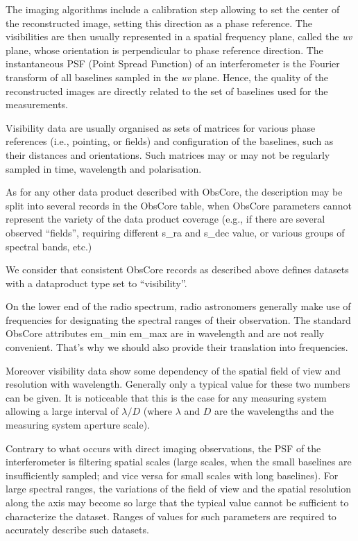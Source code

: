 \documentclass[11pt,a4paper]{ivoa}
\begin{document}
The imaging algorithms include a calibration step allowing to set the center of the 
reconstructed image, setting this direction as a phase reference. The visibilities
are then usually represented in a spatial frequency plane, called the \emph{uv} plane, 
whose orientation is perpendicular to phase reference direction. The instantaneous PSF 
(Point Spread Function) of an interferometer is the Fourier transform of all baselines 
sampled in the \emph{uv} plane. Hence, the quality of the reconstructed images are 
directly related to the set of baselines used for the measurements.

Visibility data are usually organised as sets of matrices for various phase references
(i.e., pointing, or fields) and configuration of the baselines, such as their
distances and orientations. Such matrices may or may not be regularly sampled in time, 
wavelength and polarisation.
    
As for any other data product described with ObsCore, the description may be split into
several records in the ObsCore table, when ObsCore parameters cannot represent the 
variety of the data product coverage (e.g., if there are several observed ``fields'', 
requiring different s\_ra and s\_dec value, or various groups of spectral bands, etc.) 

We consider that consistent ObsCore records as described above defines datasets with 
a dataproduct type set to ``visibility''.

On the lower end of the radio spectrum, radio astronomers generally make use of 
frequencies for designating the spectral ranges of their observation. The standard 
ObsCore attributes em\_min em\_max  are in wavelength and are not really convenient. 
That's why we should also provide their translation into frequencies. 
        
Moreover visibility data show some dependency of the spatial field of view and resolution 
with wavelength. Generally only a typical value for these two numbers can be given. It is 
noticeable that this is the case for any measuring system allowing a large interval of 
$\lambda/D$ (where $\lambda$ and $D$ are the wavelengths and the measuring system
aperture scale). 

Contrary to what occurs with direct imaging observations, the PSF of the interferometer
is filtering spatial scales (large scales, when the small baselines are insufficiently 
sampled; and vice versa for small scales with long baselines).
For large spectral ranges, the variations of the field of view and the spatial resolution 
along the axis may become so large that the typical value cannot be sufficient to 
characterize the dataset. Ranges of values for such parameters are required to accurately 
describe such datasets.
\end{document}

